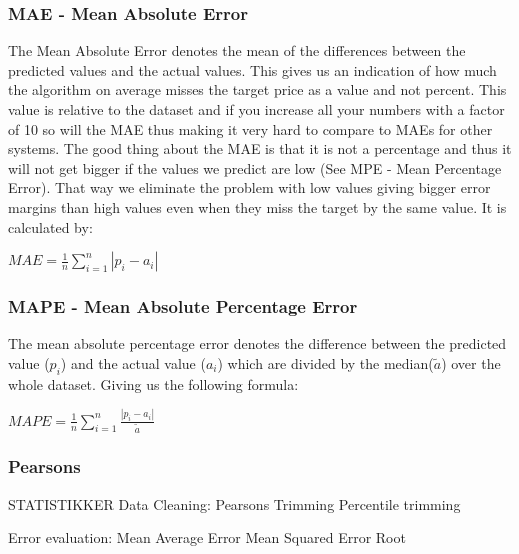 
\subsubsection{MAE - Mean Absolute Error}
\label{sec:maeStatistics}
The Mean Absolute Error denotes the mean of the differences between the predicted values and the actual values. This gives us an indication of how much the algorithm on average misses the target price as a value and not percent. This value is relative to the dataset and if you increase all your numbers with a factor of 10 so will the MAE thus making it very hard to compare to MAEs for other systems. The good thing about the MAE is that it is not a percentage and thus it will not get bigger if the values we predict are low (See MPE - Mean Percentage Error). That way we eliminate the problem with low values giving bigger error margins than high values even when they miss the target by the same value. It is calculated by:


\centerline{$ MAE = \frac{1}{n}\sum_{i=1}^{n}|p_i-a_i| $}



\subsubsection{MAPE - Mean Absolute Percentage Error}
The mean absolute percentage error denotes the difference between the predicted value ($p_i$) and the actual value ($a_i$) which are divided by the median($\tilde{a}$) over the whole dataset. Giving us the following formula:

\centerline{$MAPE = \frac{1}{n}\sum_{i=1}^{n}\frac{|p_i-a_i|}{\tilde{a}}$}


\subsubsection{Pearsons} \label{sec:Pearsons}


STATISTIKKER
	Data Cleaning:
		Pearsons
		Trimming
		Percentile trimming

	Error evaluation:
		Mean Average Error
		Mean Squared Error
		Root 
